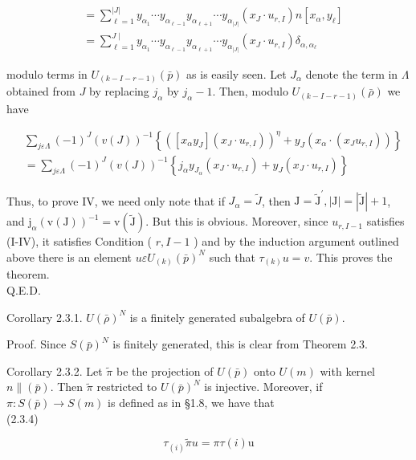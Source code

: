 \documentclass[10pt]{article}
\begin{document}
$$
\begin{aligned}
& =\sum_{\ell=1}^{|J|} y_{\alpha_{1}} \cdots y_{\alpha_{\ell-1}} y_{\alpha_{\ell+1}} \cdots y_{\alpha_{|J|}}\left(x_{J} \cdot u_{r, I}\right) n\left[x_{\alpha}, y_{\ell}\right] \\
& =\sum_{\ell=1}^{J \mid} y_{\alpha_{1}} \cdots y_{\alpha_{\ell-1}} y_{\alpha_{\ell+1}} \cdots y_{\alpha_{|J|}}\left(x_{J} \cdot u_{r, I}\right) \delta_{\alpha, \alpha_{\ell}}
\end{aligned}
$$

modulo terms in $U_{(k-I-r-1)}(\bar{p})$ as is easily seen. Let $J_{\alpha}$ denote the term in $\Lambda$ obtained from $J$ by replacing $j_{\alpha}$ by $j_{\alpha}-1$. Then, modulo $U_{(k-I-r-1)}(\bar{\rho})$ we have

$$
\begin{aligned}
& \sum_{j \varepsilon \Lambda}(-1)^{J}(v(J))^{-1}\left\{\left(\left[x_{\alpha} y_{J}\right]\left(x_{J} \cdot u_{r, I}\right)\right)^{\eta}+y_{J}\left(x_{\alpha} \cdot\left(x_{J} u_{r, I}\right)\right)\right\} \\
& =\sum_{j \varepsilon \Lambda}(-1)^{J}(v(J))^{-1}\left\{j_{\alpha} y_{J_{\alpha}}\left(x_{J} \cdot u_{r, I}\right)+y_{J}\left(x_{J} \cdot u_{r, I}\right)\right\}
\end{aligned}
$$

Thus, to prove IV, we need only note that if $J_{\alpha}=\tilde{J}$, then $\mathrm{J}=\tilde{\mathrm{J}}^{\prime},|\mathrm{J}|=|\tilde{\mathrm{J}}|+1$, and $\mathrm{j}_{\alpha}(\mathrm{v}(\mathrm{J}))^{-1}=\mathrm{v}(\tilde{\mathrm{J}})$. But this is obvious. Moreover, since $u_{r, I-1}$ satisfies (I-IV), it satisfies Condition ( $r, I-1$ ) and by the induction argument outlined above there is an element $u \varepsilon U_{(k)}(\bar{p})^{N}$ such that $\tau_{(k)} u=v$. This proves the theorem.\\
Q.E.D.

Corollary 2.3.1. $U(\bar{\rho})^{N}$ is a finitely generated subalgebra of $U(\bar{p})$.

Proof. Since $S(\bar{p})^{N}$ is finitely generated, this is clear from Theorem 2.3.

Corollary 2.3.2. Let $\tilde{\pi}$ be the projection of $U(\bar{p})$ onto $U(m)$ with kernel $n \|(\bar{p})$. Then $\tilde{\pi}$ restricted to $U(\bar{p})^{N}$ is injective. Moreover, if $\pi: S(\bar{p}) \rightarrow S(m)$ is defined as in §1.8, we have that\\
(2.3.4)

$$
\tau_{(i)} \tilde{\pi} u=\pi \tau(i) \mathrm{u}
$$
\end{document}
